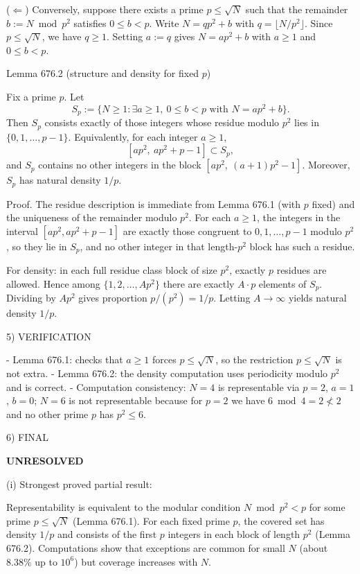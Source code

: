 ($\Leftarrow$) Conversely, suppose there exists a prime $p\le\sqrt N$ such that the remainder $b:=N\bmod p^2$ satisfies $0\le b<p$. Write $N=qp^2+b$ with $q=\lfloor N/p^2\rfloor$. Since $p\le\sqrt N$, we have $q\ge 1$. Setting $a:=q$ gives $N=ap^2+b$ with $a\ge 1$ and $0\le b<p$.


Lemma 676.2 (structure and density for fixed $p$)

Fix a prime $p$. Let
\[
S_p:=\{N\ge 1: \exists a\ge 1,\ 0\le b<p\text{ with }N=ap^2+b\}.
\]
Then $S_p$ consists exactly of those integers whose residue modulo $p^2$ lies in $\{0,1,\dots,p-1\}$. Equivalently, for each integer $a\ge 1$,
\[
 [ap^2,\ ap^2+p-1]\subset S_p,
\]
and $S_p$ contains no other integers in the block $[ap^2,\ (a+1)p^2-1]$.
Moreover, $S_p$ has natural density $1/p$.

Proof.
The residue description is immediate from Lemma 676.1 (with $p$ fixed) and the uniqueness of the remainder modulo $p^2$.
For each $a\ge 1$, the integers in the interval $[ap^2,ap^2+p-1]$ are exactly those congruent to $0,1,\dots,p-1$ modulo $p^2$, so they lie in $S_p$, and no other integer in that length-$p^2$ block has such a residue.

For density: in each full residue class block of size $p^2$, exactly $p$ residues are allowed. Hence among $\{1,2,\dots,Ap^2\}$ there are exactly $A\cdot p$ elements of $S_p$. Dividing by $Ap^2$ gives proportion $p/(p^2)=1/p$. Letting $A\to\infty$ yields natural density $1/p$.


5) VERIFICATION

- Lemma 676.1: checks that $a\ge 1$ forces $p\le\sqrt N$, so the restriction $p\le\sqrt N$ is not extra.
- Lemma 676.2: the density computation uses periodicity modulo $p^2$ and is correct.
- Computation consistency: $N=4$ is representable via $p=2$, $a=1$, $b=0$; $N=6$ is not representable because for $p=2$ we have $6\bmod 4=2\not<2$ and no other prime $p$ has $p^2\le 6$.

6) FINAL

\textbf{UNRESOLVED}

(i) Strongest proved partial result:

Representability is equivalent to the modular condition $N\bmod p^2<p$ for some prime $p\le\sqrt N$ (Lemma 676.1). For each fixed prime $p$, the covered set has density $1/p$ and consists of the first $p$ integers in each block of length $p^2$ (Lemma 676.2). Computations show that exceptions are common for small $N$ (about $8.38\%$ up to $10^6$) but coverage increases with $N$.

